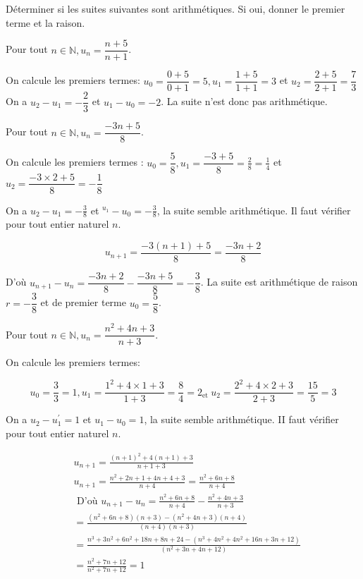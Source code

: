 \documentclass[11pt,a4paper]{article}  %
\begin{document}

Déterminer si les suites suivantes sont arithmétiques. Si oui, donner le premier terme et la raison.
	\begin{enumMet}
	\item Pour tout $n \in \mathbb{N}, u_n=\dfrac{n+5}{n+1}$.
	\begin{corrBox}
		On calcule les premiers termes: $u_0=\dfrac{0+5}{0+1}=5, u_1=\dfrac{1+5}{1+1}=3$ et $u_2=\dfrac{2+5}{2+1}=\dfrac{7}{3}$
		On a $u_2-u_1=-\dfrac{2}{3}$ et $u_1-u_0=-2$.
		La suite n'est donc pas arithmétique.		
	\end{corrBox}
	\item Pour tout $n \in \mathbb{N}, u_n=\dfrac{-3 n+5}{8}$.
	\begin{corrBox}
		On calcule les premiers termes : $u_0=\dfrac{5}{8}, u_1=\dfrac{-3+5}{8}=\frac{2}{8}=\frac{1}{4}$ et $u_2=\dfrac{-3 \times 2+5}{8}=-\dfrac{1}{8}$
		
		On a $u_2-u_1=-\frac{3}{8}$ et ${ }^{u_1}-u_0=-\frac{3}{8}$, la suite semble arithmétique. Il faut vérifier pour tout entier naturel $n$.
		
		$$
		u_{n+1}=\dfrac{-3(n+1)+5}{8}=\dfrac{-3 n+2}{8}
		$$
		
		
		D'où $u_{n+1}-u_n=\dfrac{-3 n+2}{8}-\dfrac{-3 n+5}{8}=-\dfrac{3}{8}$.
		La suite est arithmétique de raison $r=-\dfrac{3}{8}$ et de premier terme $u_0=\dfrac{5}{8}$.		
	\end{corrBox}
	\item Pour tout $n \in \mathbb{N}, u_n=\dfrac{n^2+4 n+3}{n+3}$.
	\begin{corrBox}
		On calcule les premiers termes:
		
		$$
		u_0=\frac{3}{3}=1, u_1=\frac{1^2+4 \times 1+3}{1+3}=\frac{8}{4}=2{ }_{\text {et }} u_2=\frac{2^2+4 \times 2+3}{2+3}=\frac{15}{5}=3
		$$
		
		
		On a $u_2-u_1^{\prime}=1$ et $u_1-u_0=1$, la suite semble arithmétique. II faut vérifier pour tout entier naturel $n$.
		
		$$
		\begin{aligned}
			& u_{n+1}=\frac{(n+1)^2+4(n+1)+3}{n+1+3} \\
			& u_{n+1}=\frac{n^2+2 n+1+4 n+4+3}{n+4}=\frac{n^2+6 n+8}{n+4} \\
			& \text { D'où } u_{n+1}-u_n=\frac{n^2+6 n+8}{n+4}-\frac{n^2+4 n+3}{n+3} \\
			& =\frac{\left(n^2+6 n+8\right)(n+3)-\left(n^2+4 n+3\right)(n+4)}{(n+4)(n+3)} \\
			& =\frac{n^3+3 n^2+6 n^2+18 n+8 n+24-\left(n^3+4 n^2+4 n^2+16 n+3 n+12\right)}{\left(n^2+3 n+4 n+12\right)} \\
			& =\frac{n^2+7 n+12}{n^2+7 n+12}=1
		\end{aligned}
		$$
		

\end{corrBox}
\end{enumMet}
\end{document}
